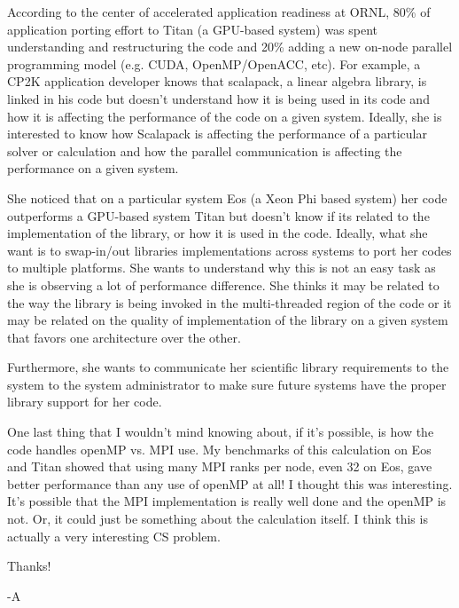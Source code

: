 According to the center of accelerated application readiness at ORNL, 80\% of application porting effort to Titan (a GPU-based system) was spent understanding and restructuring the code and 20\% adding a new on-node parallel programming model (e.g. CUDA, OpenMP/OpenACC, etc). 
For example, a CP2K application developer knows that scalapack, a linear algebra library, is linked in his code but doesn't understand how it is being used in its code and how it is affecting the performance of the code on a given system. Ideally, she is interested to know how Scalapack is affecting the performance of a particular solver or calculation and how the parallel communication is affecting the performance on a given system.  

She noticed that on a particular system Eos (a Xeon Phi based system) her code outperforms a GPU-based system Titan but doesn't know if its related to the implementation of the library, or how it is used in the code. Ideally, what she want is to swap-in/out libraries implementations across systems to port her codes to multiple platforms. She wants to understand why this is not an easy task as she is observing a lot of  performance difference. She thinks it may be related to the way the library is being invoked in the multi-threaded region of the code or it may be related on the quality of implementation of the library on a given system that favors one architecture over the other. 

 Furthermore, she wants to communicate her scientific library requirements to the system to the system administrator to make sure future systems have the proper library support for her code. 
 


One last thing that I wouldn't mind knowing about, if it's possible, is how the code handles openMP vs. MPI use. My benchmarks of this calculation on Eos and Titan showed that using many MPI ranks per node, even 32 on Eos, gave better performance than any use of openMP at all! I thought this was interesting. It's possible that the MPI implementation is really well done and the openMP is not. Or, it could just be something about the calculation itself. I think this is actually a very interesting CS problem.

Thanks!

-A

